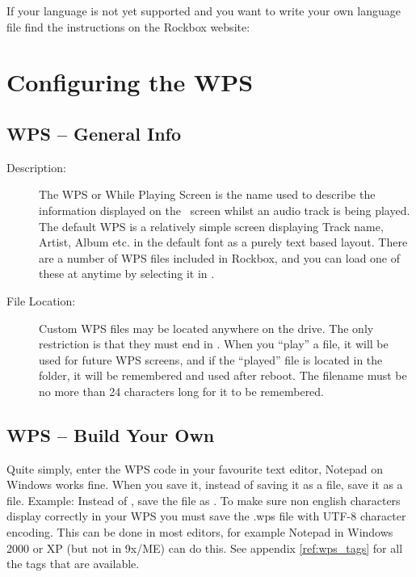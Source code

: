 If your language is not yet supported and you want to write your own language
file find the instructions on the Rockbox website:

\section{\label{ref:ConfiguringtheWPS}Configuring the WPS}

\subsection{WPS -- General Info}

\begin{description}
\item[Description: ] The WPS or While Playing Screen is the name used to describe 
the information displayed on the \daps\ screen whilst an audio track is
being played. The default WPS is a relatively simple screen displaying
Track name, Artist, Album etc. in the default font as a purely text based
layout. There are a number of WPS files included in Rockbox, and you can 
load one of these at anytime by selecting it in
.



\item [File Location: ]Custom WPS files may be located anywhere on the drive. 
The only restriction is that they must end in . When you ``play''
a  file, it will be used for future WPS screens, and if the 
``played''  file is located in the  folder, it 
will be remembered and used after reboot. The  filename must be no 
more than 24 characters long for it to be remembered.
\end{description}

\subsection{\label{ref:CreateYourOwnWPS}WPS -- Build Your Own}
Quite simply, enter the WPS code in your favourite text editor, Notepad on
Windows works fine. When you save it, instead of saving it as a  
file, save it as a  file. Example: Instead of , 
save the file as . To make sure non english characters 
display correctly in your WPS you must save the .wps file with UTF-8 character 
encoding. This can be done in most editors, for example Notepad in Windows 2000
or XP (but not in 9x/ME) can do this. See appendix \ref{ref:wps_tags} for all 
the tags that are available.

